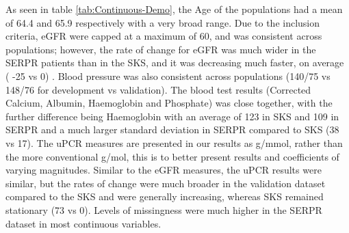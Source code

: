 \documentclass[
]{article}
\begin{document}
As seen in table \ref{tab:Continuous-Demo}, the Age of the populations had a mean of 64.4 and 65.9 respectively with a very broad range. Due to the inclusion criteria, eGFR were capped at a maximum of 60, and was consistent across populations; however, the rate of change for eGFR was much wider in the SERPR patients than in the SKS, and it was decreasing much faster, on average ( -25 vs 0) . Blood pressure was also consistent across populations (140/75 vs 148/76 for development vs validation). The blood test results (Corrected Calcium, Albumin, Haemoglobin and Phosphate) was close together, with the further difference being Haemoglobin with an average of 123 in SKS and 109 in SERPR and a much larger standard deviation in SERPR compared to SKS (38 vs 17). The uPCR measures are presented in our results as g/mmol, rather than the more conventional g/mol, this is to better present results and coefficients of varying magnitudes. Similar to the eGFR measures, the uPCR results were similar, but the rates of change were much broader in the validation dataset compared to the SKS and were generally increasing, whereas SKS remained stationary (73 vs 0). Levels of missingness were much higher in the SERPR dataset in most continuous variables.
\end{document}
